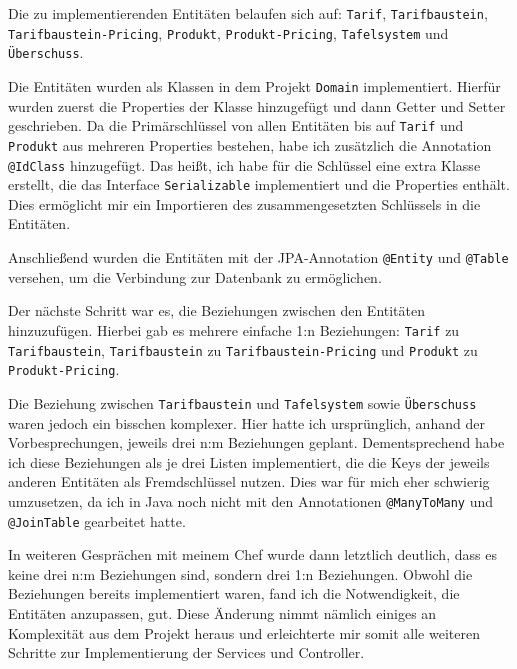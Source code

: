 Die zu implementierenden Entitäten belaufen sich auf: \texttt{Tarif}, \texttt{Tarifbaustein}, \texttt{Tarifbaustein-Pricing}, 
\texttt{Produkt}, \texttt{Produkt-Pricing}, \texttt{Tafelsystem} und \texttt{Über\-schuss}.


Die Entitäten wurden als Klassen in dem Projekt \texttt{Domain} implementiert. Hierfür wurden zuerst die Properties der Klasse hinzugefügt und dann Getter und Setter geschrieben. 
Da die Primärschlüssel von allen Entitäten bis auf \texttt{Tarif} und \texttt{Produkt} aus mehreren Properties bestehen, habe ich zusätzlich die Annotation 
\texttt{@IdClass} hinzugefügt. Das heißt, ich habe für die Schlüssel eine extra Klasse erstellt, die das Interface \texttt{Serializable} implementiert und 
die Properties enthält. Dies ermöglicht mir ein Importieren des zusammengesetzten Schlüssels in die Entitäten.

Anschließend wurden die Entitäten mit der JPA-Annotation \texttt{@Entity} und \texttt{@Table} versehen, um die Verbindung zur Datenbank zu ermöglichen.

Der nächste Schritt war es, die Beziehungen zwischen den Entitäten hinzuzufügen. Hierbei gab es mehrere einfache 1:n Beziehungen: \texttt{Tarif} zu \texttt{Tarifbaustein}, \texttt{Tarifbaustein} zu \texttt{Tarifbaustein-Pricing} und \texttt{Produkt} zu \texttt{Produkt-Pricing}.

Die Beziehung zwischen \texttt{Tarifbaustein} und \texttt{Tafelsystem} sowie \texttt{Überschuss} waren jedoch ein bisschen komplexer. 
Hier hatte ich ursprünglich, anhand der Vorbesprechungen, jeweils drei n:m Beziehungen geplant. 
Dementsprechend habe ich diese Beziehungen als je drei Listen implementiert, die die Keys der jeweils anderen Entitäten als Fremdschlüssel nutzen.
Dies war für mich eher schwierig umzusetzen, da ich in Java noch nicht mit den Annotationen \texttt{@ManyToMany} und \texttt{@JoinTable} gearbeitet hatte.

In weiteren Gesprächen mit meinem Chef wurde dann letztlich deutlich, dass es keine drei n:m Beziehungen sind, sondern drei 1:n Beziehungen. 
Obwohl die Beziehungen bereits implementiert waren, fand ich die Notwendigkeit, die Entitäten anzupassen, gut. Diese Änderung nimmt nämlich einiges an Komplexität aus dem Projekt heraus und 
erleichterte mir somit alle weiteren Schritte zur Implementierung der Services und Controller.


